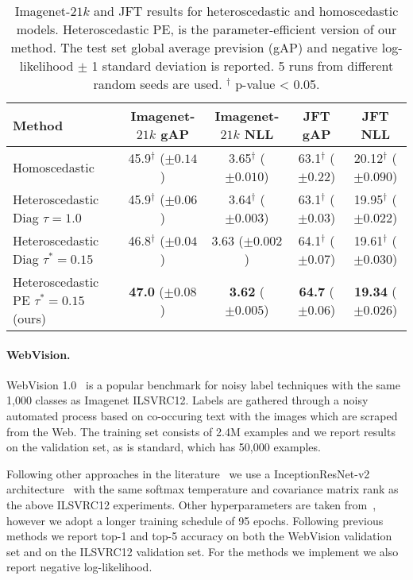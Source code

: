 \documentclass[final]{cvpr}
\begin{document}
\begin{table*}[tbh]
\centering
\begin{tabular}{lcccc}
\toprule
Method & Imagenet-$21k$ gAP & Imagenet-$21k$ NLL & JFT gAP & JFT NLL \\
\midrule
Homoscedastic & 45.9$^\dagger$ ($\pm 0.14$) & 3.65$^\dagger$ ($\pm 0.010$) & 63.1$^\dagger$ ($\pm 0.22$) & 20.12$^\dagger$ ($\pm 0.090$) \\
Heteroscedastic Diag $\tau = 1.0$~\cite{collier2020analysis} & 45.9$^\dagger$   ($\pm 0.06$) & 3.64$^\dagger$ ($\pm 0.003$) & 63.1$^\dagger$ ($\pm 0.03$)  & 19.95$^\dagger$ ($\pm 0.022$)\\ 
Heteroscedastic Diag $\tau^* = 0.15$~\cite{collier2020analysis} & 46.8$^\dagger$   ($\pm 0.04$) & 3.63 ($\pm 0.002$) & 64.1$^\dagger$ ($\pm 0.07$) & 19.61$^\dagger$ ($\pm 0.030$)\\ 
Heteroscedastic PE $\tau^* = 0.15$ (ours) & \textbf{47.0}  ($\pm 0.08$) & \textbf{3.62} ($\pm 0.005$) & \textbf{64.7} ($\pm 0.06$) & \textbf{19.34} ($\pm 0.026$)\\ 
\bottomrule
\end{tabular}
\caption{Imagenet-$21k$ and JFT results for heteroscedastic and homoscedastic models. Heteroscedastic PE, is the parameter-efficient version of our method. The test set global average prevision (gAP) and negative log-likelihood $\pm$ 1 standard deviation is reported. 5 runs from different random seeds are used. $^\dagger$ p-value < 0.05.}
\label{table:het_vs_hom_imagenet$21k$_jft}
\end{table*}

\paragraph{WebVision.} WebVision 1.0~\cite{li2017webvision} is a popular benchmark for noisy label techniques with the same 1,000 classes as Imagenet ILSVRC12. Labels are gathered through a noisy automated process based on co-occuring text with the images which are scraped from the Web. The training set consists of 2.4M examples and we report results on the validation set, as is standard, which has 50,000 examples.

Following other approaches in the literature~\cite{MentorNet.2018,guo2018curriculumnet,jiang2020beyond,cao2020heteroskedastic} we use a InceptionResNet-v2 architecture~\cite{inceptionresnet2017} with the same softmax temperature and covariance matrix rank as the above ILSVRC12 experiments. Other hyperparameters are taken from~\citet{jiang2020beyond}, however we adopt a longer training schedule of 95 epochs. Following previous methods we report top-1 and top-5 accuracy on both the WebVision validation set and on the ILSVRC12 validation set. For the methods we implement we also report negative log-likelihood.
\end{document}
